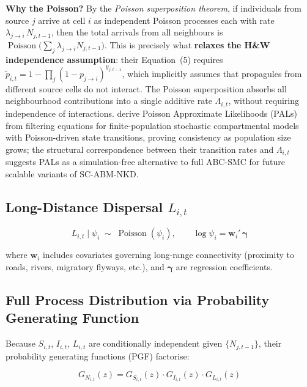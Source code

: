 \documentclass[12pt,a4paper]{article}
\theoremstyle{definition}
\newcommand{\Pois}{\operatorname{Poisson}}
\newcommand{\bgamma}{\bm{\gamma}}
\newcommand{\bw}{\bm{w}}
\newcommand{\tp}{\tilde{p}}
\begin{document}
\noindent\textbf{Why the Poisson?}  By the \emph{Poisson superposition theorem},
if individuals from source $j$ arrive at cell $i$ as independent Poisson
processes each with rate $\lambda_{j\to i}\, N_{j,t-1}$, then the total
arrivals from all neighbours is $\Pois\!\bigl(\sum_j \lambda_{j\to i}
N_{j,t-1}\bigr)$.  This is precisely what \textbf{relaxes the H\&W
independence assumption}: their Equation~(5) requires
$\tp_{i,t} = 1 - \prod_j (1-p_{j\to i})^{y_{j,t-1}}$, which implicitly
assumes that propagules from different source cells do not interact.  The
Poisson superposition absorbs all neighbourhood contributions into a single
additive rate $\Lambda_{i,t}$, without requiring independence of interactions.
\citet{whitehouse2023} derive Poisson Approximate Likelihoods (PALs) from
filtering equations for finite-population stochastic compartmental models
with Poisson-driven state transitions, proving consistency as population
size grows; the structural correspondence between their transition rates
and $\Lambda_{i,t}$ suggests PALs as a simulation-free alternative to
full ABC-SMC for future scalable variants of SC-ABM-NKD.

\subsection{Long-Distance Dispersal \texorpdfstring{$L_{i,t}$}{L}}

\begin{equation}
  L_{i,t} \;\Big|\; \psi_i \;\sim\; \Pois(\psi_i),
  \qquad
  \log \psi_i = \bw_i'\, \bgamma
  \label{eq:ldd}
\end{equation}

where $\bw_i$ includes covariates governing long-range connectivity (proximity
to roads, rivers, migratory flyways, etc.), and $\bgamma$ are regression
coefficients.

\subsection{Full Process Distribution via Probability Generating Function}

Because $S_{i,t}$, $I_{i,t}$, $L_{i,t}$ are conditionally independent given
$\{N_{j,t-1}\}$, their probability generating functions (PGF) factorise:

\begin{equation}
  G_{N_{i,t}}(z)
  = G_{S_{i,t}}(z) \cdot G_{I_{i,t}}(z) \cdot G_{L_{i,t}}(z)
  \label{eq:pgf}
\end{equation}
\end{document}
